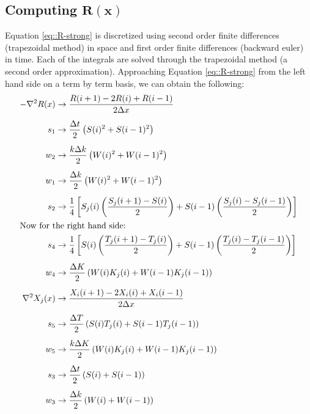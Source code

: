 \documentclass{article}
\def\grad{\mathbf\nabla}
\begin{document}
\subsection{Computing $\mathbf{R(x)}$}
Equation \ref{eq::R-strong} is discretized using second order finite differences (trapezoidal method) in space and first order finite differences (backward euler) in time. Each of the integrals are solved through the trapezoidal method (a second order approximation). Approaching Equation \ref{eq::R-strong} from the left hand side on a term by term basis, we can obtain the following:
\begin{subequations}
\begin{align}
-\grad^2R(x) &\to \frac{R(i+1)-2R(i)+R(i-1)}{2\Delta x}  \\[5pt]
s_1 &\to \frac{\Delta t}{2} \left( S(i)^2 + S(i-1)^2 \right) \\[5pt]
w_2 &\to \frac{k\Delta k}{2}\left( W(i)^2+W(i-1)^2\right)   \\[5pt]
w_1 &\to \frac{\Delta k}{2}\left(W(i)^2 + W(i-1)^2 \right)  \\[5pt]
s_2 &\to \frac{1}{4} \left[ S_j(i)\left( \frac{S_j(i+1)-S(i)}{2} \right) + S(i-1)\left(\frac{S_j(i)-S_j(i-1)}{2}\right) \right] \\ 
\intertext{Now for the right hand side:}
s_4 &\to \frac{1}{4} \left[ S(i) \left(\frac{T_j(i+1)-T_j(i)}{2} \right) + S(i-1)\left(\frac{T_j(i)-T_j(i-1)}{2} \right) \right] \\[5pt]
w_4 &\to \frac{\Delta K}{2} \left(W(i)K_j(i) + W(i-1)K_j(i-1) \right) \\[5pt]
\grad^2X_j(x) &\to \frac{X_i(i+1)-2X_i(i)+X_i(i-1)}{2\Delta x} \\[5pt]
s_5 &\to \frac{\Delta T}{2} \left(S(i)T_j(i) + S(i-1)T_j(i-1) \right) \\[5pt]
w_5 &\to \frac{k\Delta K}{2} \left(W(i)K_j(i) + W(i-1)K_j(i-1) \right) \\[5pt]
s_3 &\to \frac{\Delta t}{2} \left( S(i) + S(i-1) \right) \\[5pt]
w_3 &\to \frac{\Delta k}{2} \left( W(i) + W(i-1) \right) 
\end{align}
\end{subequations}
\end{document}
